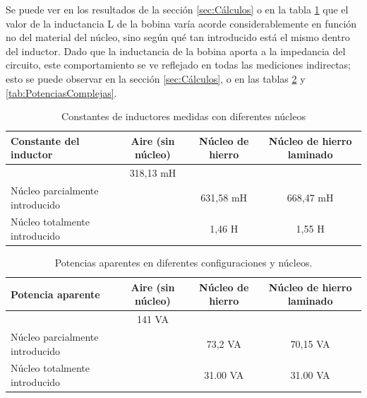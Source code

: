 \documentclass{article}
\begin{document}
            Se puede ver en los resultados de la sección \ref{sec:Cálculos} o en la tabla \ref{tab:ConstantesDelInductor} que el valor de la inductancia L de la bobina varía acorde considerablemente en función no del material del núcleo, sino según qué tan introducido está el mismo dentro del inductor. Dado que la inductancia de la bobina aporta a la impedancia del circuito, este comportamiento se ve reflejado en todas las mediciones indirectas; esto se puede observar en la sección \ref{sec:Cálculos}, o en las tablas \ref{tab:PotenciasAparentes} y \ref{tab:PotenciasComplejas}.
            
             \begin{table}[H]
                \centering
                \begin{tabular}{|l|c|c|c|}
                \hline
                Constante del inductor               & Aire (sin núcleo)     & Núcleo de hierro & Núcleo de hierro laminado \\ \hline
                                                    & 318,13 mH             &                  &                     \\ \hline
                Núcleo parcialmente introducido     &                        & 631,58 mH        & 668,47 mH            \\ \hline
                Núcleo totalmente introducido       &                        & 1,46 H          & 1,55 H                \\ \hline
                \end{tabular}
                \caption{Constantes de inductores medidas con diferentes núcleos}
                \label{tab:ConstantesDelInductor}
            \end{table}

            
            \begin{table}[H]
                \centering
                \begin{tabular}{|l|c|c|c|}
                \hline
                Potencia aparente                    & Aire (sin núcleo)  & Núcleo de hierro & Núcleo de hierro laminado \\ \hline
                                                    & 141 VA             &                  &                     \\ \hline
                Núcleo parcialmente introducido     &                    &  73,2 VA         &  70,15 VA           \\ \hline
                Núcleo totalmente introducido       &                    &  31.00 VA        &  31.00 VA           \\ \hline
                \end{tabular}
                \caption{Potencias aparentes  en diferentes configuraciones y núcleos.}
                \label{tab:PotenciasAparentes}
            \end{table}
\end{document}
